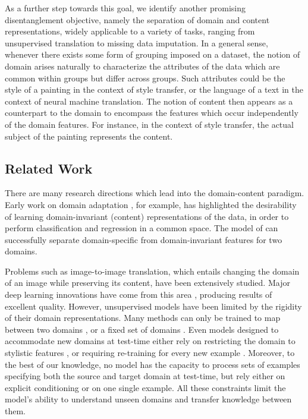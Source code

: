 \documentclass{article} %
\begin{document}
As a further step towards this goal, we identify another promising disentanglement objective, namely the separation of domain and content representations, widely applicable to a variety of tasks, ranging from unsupervised translation to missing data imputation. In a general sense, whenever there exists some form of grouping imposed on a dataset, the notion of domain arises naturally to characterize the attributes of the data which are common within groups but differ across groups. Such attributes could be the style of a painting in the context of style transfer, or the language of a text in the context of neural machine translation. The notion of content then appears as a counterpart to the domain to encompass the features which occur independently of the domain features. For instance, in the context of style transfer, the actual subject of the painting represents the content.

\subsection{Related Work}

There are many research directions which lead into the domain-content paradigm. Early work on domain adaptation \citep{ben2010theory,ganin2016domain}, for example, has highlighted the desirability of learning domain-invariant (content) representations of the data, in order to perform classification and regression in a common space. The model of \citet{gonzalez2018image} can successfully separate domain-specific from domain-invariant features for two domains.

Problems such as image-to-image translation, which entails changing the domain of an image while preserving its content, have been extensively studied. Major deep learning innovations have come from this area \citep{isola2017image, zhu2017unpaired}, producing results of excellent quality. However, unsupervised models have been limited by the rigidity of their domain representations. Many methods can only be trained to map between two domains \citep{zhu2017unpaired, taigman2016unsupervised}, or a fixed set of domains \citep{choi2018stargan, choi2019starganv2, lee2019drit++}. Even models designed to accommodate new domains at test-time either rely on restricting the domain to stylistic features \citep{liu2019few}, or requiring re-training for every new example \citep{benaim2018one}. Moreover, to the best of our knowledge, no model has the capacity to process sets of examples specifying both the source and target domain at test-time, but rely either on explicit conditioning or on one single example. All these constraints limit the model's ability to understand unseen domains and transfer knowledge between them.
\end{document}
